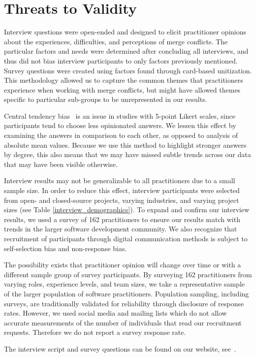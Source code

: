 \section{Threats to Validity}\label{threats}
Interview questions were open-ended and designed to elicit practitioner opinions about the experiences, difficulties, and perceptions of merge conflicts.
The particular factors and needs were determined after concluding all interviews, and thus did not bias interview participants to only factors previously mentioned.
Survey questions were created using factors found through card-based unitization.
This methodology allowed us to capture the common themes that practitioners experience when working with merge conflicts, but might have allowed themes specific to particular sub-groups to be unrepresented in our results.

Central tendency bias~\cite{guilford1954psychometric} is an issue in studies with 5-point Likert scales, since participants tend to choose less opinionated answers.
We lessen this effect by examining the answers in comparison to each other, as opposed to analysis of absolute mean values.
Because we use this method to highlight stronger answers by degree, this also means that we may have missed subtle trends across our data that may have been visible otherwise.

Interview results may not be generalizable to all practitioners due to a small sample size.
In order to reduce this effect, interview participants were selected from open- and closed-source projects, varying industries, and varying project sizes (see Table \ref{interview_demographics}).
To expand and confirm our interview results, we used a survey of 162 practitioners to ensure our results match with trends in the larger software development community.
We also recognize that recruitment of participants through digital communication methods is subject to self-selection bias and non-response bias.

The possibility exists that practitioner opinion will change over time or with a different sample group of survey participants.
By surveying 162 practitioners from varying roles, experience levels, and team sizes, we take a representative sample of the larger population of software practitioners.
Population sampling, including surveys, are traditionally validated for reliability through disclosure of response rates.
However, we used social media and mailing lists which do not allow accurate measurements of the number of individuals that read our recruitment requests.
Therefore we do not report a survey response rate.

The interview script and survey questions can be found on our website, see~\cite{companion_site}.

